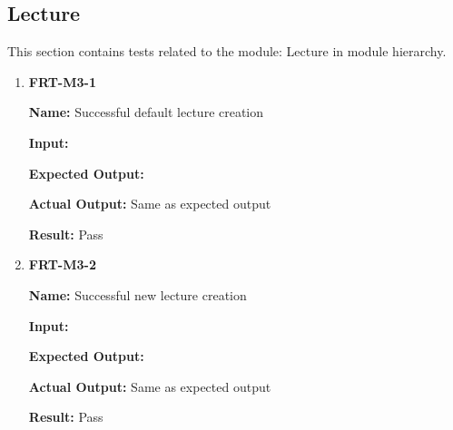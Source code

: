 \documentclass[12pt, titlepage]{article}
\begin{document}
\subsection{Lecture}
This section contains tests related to the module: Lecture in module hierarchy.
\begin{enumerate}
\item \textbf{FRT-M3-1}

\textbf{Name:} Successful default lecture creation

\textbf{Input:} 

\textbf{Expected Output:} 

\textbf{Actual Output:} Same as expected output

\textbf{Result:} Pass

\item \textbf{FRT-M3-2}

\textbf{Name:} Successful new lecture creation

\textbf{Input:} 

\textbf{Expected Output:} 

\textbf{Actual Output:} Same as expected output

\textbf{Result:} Pass
\end{enumerate}
\end{document}
